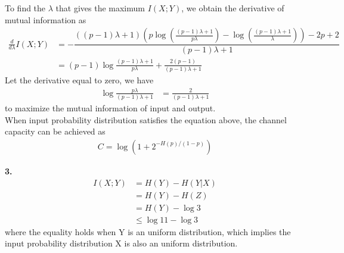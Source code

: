 \documentclass[12pt]{article}
\begin{document}
		To find the $\lambda$ that gives the maximum $I(X;Y)$, we obtain the derivative of mutual information as
		\begin{align*}
			\frac{d}{d\lambda} I(X;Y) &= -\dfrac{\left(\left(p-1\right)\lambda+1\right)\left(p\log\left(\frac{\left(p-1\right)\lambda+1}{p\lambda}\right)-\log\left(\frac{\left(p-1\right)\lambda+1}{\lambda}\right)\right)-2p+2}{\left(p-1\right)\lambda+1}  \\
			&= (p-1)\log\frac{(p-1)\lambda+1}{p\lambda} + \frac{2(p-1)}{(p-1)\lambda+1} 
		\end{align*}
		Let the derivative equal to zero, we have 
		\begin{align*}
			\log\frac{p\lambda}{(p-1)\lambda+1} &= \frac{2}{(p-1)\lambda+1} 
		\end{align*}
		to maximize the mutual information of input and output. \\
		When input probability distribution satisfies the equation above, the channel capacity can be achieved as 
		\begin{align*}
			C = \log(1+2^{-H(p)/(1-p)})
		\end{align*}
	
	\textbf{3.} 
	\begin{align*}
		I(X;Y) &= H(Y) - H(Y|X) \\
			   &= H(Y) - H(Z) \\
			   &= H(Y) - \log 3 \\
			   &\leq \log 11 - \log 3
	\end{align*}
	where the equality holds when Y is an uniform distribution, which implies the input probability distribution X is also an uniform distribution.\\
	
\end{document}
